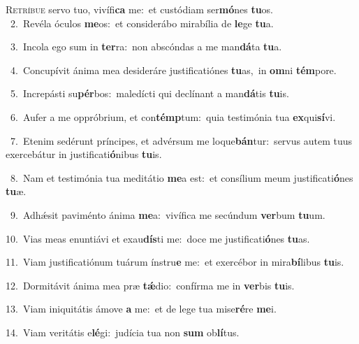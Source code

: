\lettrine{\initial\textcolor{\initialcolor}{R}}{etríbue} servo tuo, vivífi\textbf{ca} me:~\star et custódiam ser\-\textbf{mó}\-nes \textbf{tu}\-os.\\
{\numbfont\textcolor{\numbcolor}{~2.}}~Revéla óculos \textbf{me}\-os:~\star et considerábo mirabília de \textbf{le}\-ge \textbf{tu}\-a.\par
{\numbfont\textcolor{\numbcolor}{~3.}}~Incola ego sum in \textbf{ter}\-ra:~\star non abscóndas a me man\-\textbf{dá}\-ta \textbf{tu}\-a.\par
{\numbfont\textcolor{\numbcolor}{~4.}}~Concupívit ánima mea desideráre justificatiónes \textbf{tu}\-as,~\star in \textbf{om}\-ni \textbf{tém}\-pore.\par
{\numbfont\textcolor{\numbcolor}{~5.}}~Increpásti su\-\textbf{pér}\-bos:~\star maledícti qui declínant a man\-\textbf{dá}\-tis \textbf{tu}\-is.\par
{\numbfont\textcolor{\numbcolor}{~6.}}~Aufer a me oppróbrium, et con\-\textbf{témp}\-tum:~\star quia testimónia tua \textbf{ex}\-qui\-\textbf{sí}\-vi.\par
{\numbfont\textcolor{\numbcolor}{~7.}}~Etenim sedérunt príncipes, et advérsum me loque\-\textbf{bán}\-tur:~\star servus autem tuus exercebátur in justificati\-\textbf{ó}\-nibus \textbf{tu}\-is.\par
{\numbfont\textcolor{\numbcolor}{~8.}}~Nam et testimónia tua meditátio \textbf{me}\-a est:~\star et consílium meum justificati\-\textbf{ó}\-nes \textbf{tu}\-æ.\par
{\numbfont\textcolor{\numbcolor}{~9.}}~Adhǽsit paviménto ánima \textbf{me}\-a:~\star vivífica me secúndum \textbf{ver}\-bum \textbf{tu}\-um.\par
{\numbfont\textcolor{\numbcolor}{10.}}~Vias meas enuntiávi et exau\-\textbf{dís}\-ti me:~\star doce me justificati\-\textbf{ó}\-nes \textbf{tu}\-as.\par
{\numbfont\textcolor{\numbcolor}{11.}}~Viam justificatiónum tuárum ínstru\textbf{e} me:~\star et exercébor in mira\-\textbf{bí}\-libus \textbf{tu}\-is.\par
{\numbfont\textcolor{\numbcolor}{12.}}~Dormitávit ánima mea præ \textbf{tǽ}\-dio:~\star confírma me in \textbf{ver}\-bis \textbf{tu}\-is.\par
{\numbfont\textcolor{\numbcolor}{13.}}~Viam iniquitátis ámove \textbf{a} me:~\star et de lege tua mise\-\textbf{ré}\-re \textbf{me}\-i.\par
{\numbfont\textcolor{\numbcolor}{14.}}~Viam veritátis e\-\textbf{lé}\-gi:~\star judícia tua non \textbf{sum} ob\-\textbf{lí}\-tus.\par
